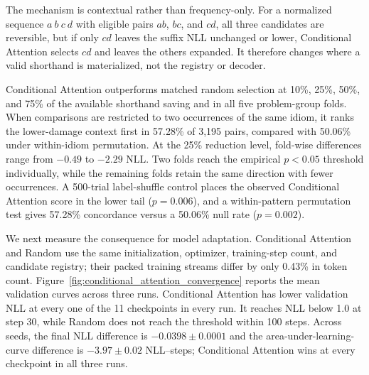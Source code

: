 The mechanism is contextual rather than frequency-only. For a normalized sequence $a\ b\ c\ d$ with eligible pairs $ab$, $bc$, and $cd$, all three candidates are reversible, but if only $cd$ leaves the suffix NLL unchanged or lower, Conditional Attention selects $cd$ and leaves the others expanded. It therefore changes where a valid shorthand is materialized, not the registry or decoder.

Conditional Attention outperforms matched random selection at 10\%, 25\%, 50\%, and 75\% of the available shorthand saving and in all five problem-group folds. When comparisons are restricted to two occurrences of the same idiom, it ranks the lower-damage context first in 57.28\% of 3,195 pairs, compared with 50.06\% under within-idiom permutation. At the 25\% reduction level, fold-wise differences range from $-0.49$ to $-2.29$ NLL. Two folds reach the empirical $p<0.05$ threshold individually, while the remaining folds retain the same direction with fewer occurrences. A 500-trial label-shuffle control places the observed Conditional Attention score in the lower tail ($p=0.006$), and a within-pattern permutation test gives 57.28\% concordance versus a 50.06\% null rate ($p=0.002$).

We next measure the consequence for model adaptation. Conditional Attention and Random use the same initialization, optimizer, training-step count, and candidate registry; their packed training streams differ by only 0.43\% in token count. Figure~\ref{fig:conditional_attention_convergence} reports the mean validation curves across three runs. Conditional Attention has lower validation NLL at every one of the 11 checkpoints in every run. It reaches NLL below 1.0 at step 30, while Random does not reach the threshold within 100 steps. Across seeds, the final NLL difference is $-0.0398\pm0.0001$ and the area-under-learning-curve difference is $-3.97\pm0.02$ NLL--steps; Conditional Attention wins at every checkpoint in all three runs.

